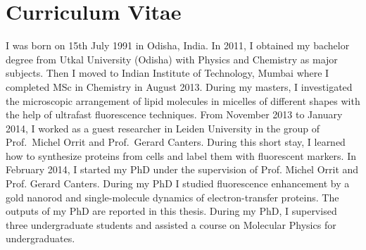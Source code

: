 \chapter*{Curriculum Vitae}
\label{ch:CV}

I was born on 15th July 1991 in Odisha, India.
In 2011, I obtained my bachelor degree from Utkal University (Odisha) with Physics and Chemistry as major subjects.
Then I moved to Indian Institute of Technology, Mumbai where I completed MSc in Chemistry in August 2013.
During my masters, I investigated the microscopic arrangement of lipid molecules in micelles of different shapes with the help of ultrafast fluorescence techniques.
From November 2013 to January 2014, I worked as a guest researcher in Leiden University in the group of Prof.~Michel Orrit and Prof.~Gerard Canters.
During this short stay, I learned how to synthesize proteins from cells and label them with fluorescent markers.
In February 2014, I started my PhD under the supervision of Prof. Michel Orrit and Prof. Gerard Canters.
During my PhD I studied fluorescence enhancement by a gold nanorod and single-molecule dynamics of electron-transfer proteins.
The outputs of my PhD are reported in this thesis.
During my PhD, I supervised three undergraduate students and assisted a course on Molecular Physics for undergraduates.


